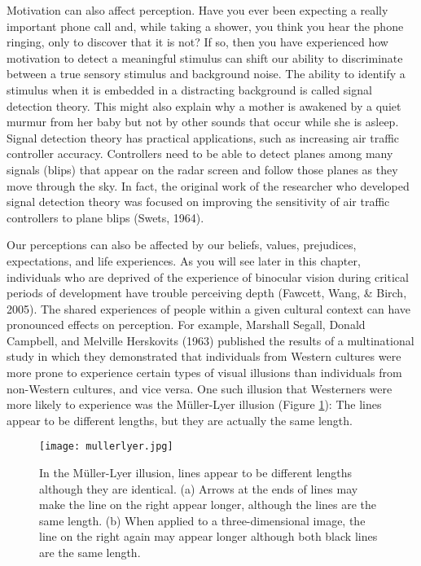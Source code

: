 Motivation can also affect perception. Have you ever been expecting a really important phone call and, while taking a shower, you think you hear the phone ringing, only to discover that it is not? If so, then you have experienced how motivation to detect a meaningful stimulus can shift our ability to discriminate between a true sensory stimulus and background noise. The ability to identify a stimulus when it is embedded in a distracting background is called signal detection theory. This might also explain why a mother is awakened by a quiet murmur from her baby but not by other sounds that occur while she is asleep. Signal detection theory has practical applications, such as increasing air traffic controller accuracy. Controllers need to be able to detect planes among many signals (blips) that appear on the radar screen and follow those planes as they move through the sky. In fact, the original work of the researcher who developed signal detection theory was focused on improving the sensitivity of air traffic controllers to plane blips (Swets, 1964).

Our perceptions can also be affected by our beliefs, values, prejudices, expectations, and life experiences. As you will see later in this chapter, individuals who are deprived of the experience of binocular vision during critical periods of development have trouble perceiving depth (Fawcett, Wang, \& Birch, 2005). The shared experiences of people within a given cultural context can have pronounced effects on perception. For example, Marshall Segall, Donald Campbell, and Melville Herskovits (1963) published the results of a multinational study in which they demonstrated that individuals from Western cultures were more prone to experience certain types of visual illusions than individuals from non-Western cultures, and vice versa. One such illusion that Westerners were more likely to experience was the M\"{u}ller-Lyer illusion (Figure \ref{fig:mullerlyer}): The lines appear to be different lengths, but they are actually the same length.

\begin{figure}[ht]
\centering\texttt{[image: mullerlyer.jpg]}
\caption{ In the M\"{u}ller-Lyer illusion, lines appear to be different lengths although they are identical. (a) Arrows at the ends of lines may make the line on the right appear longer, although the lines are the same length. (b) When applied to a three-dimensional image, the line on the right again may appear longer although both black lines are the same length.}
\label{fig:mullerlyer} %
\end{figure}

